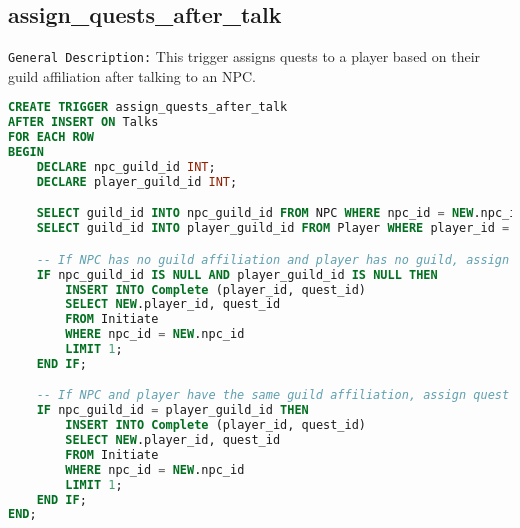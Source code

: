 \documentclass{article}
\begin{document}
\subsection{assign\_quests\_after\_talk}

\texttt{General Description:} This trigger assigns quests to a player based on their guild affiliation after talking to an NPC.

\begin{lstlisting}[language=SQL]
CREATE TRIGGER assign_quests_after_talk
AFTER INSERT ON Talks
FOR EACH ROW
BEGIN
    DECLARE npc_guild_id INT;
    DECLARE player_guild_id INT;

    SELECT guild_id INTO npc_guild_id FROM NPC WHERE npc_id = NEW.npc_id;
    SELECT guild_id INTO player_guild_id FROM Player WHERE player_id = NEW.player_id;

    -- If NPC has no guild affiliation and player has no guild, assign quest
    IF npc_guild_id IS NULL AND player_guild_id IS NULL THEN
        INSERT INTO Complete (player_id, quest_id)
        SELECT NEW.player_id, quest_id
        FROM Initiate
        WHERE npc_id = NEW.npc_id
        LIMIT 1;
    END IF;

    -- If NPC and player have the same guild affiliation, assign quest
    IF npc_guild_id = player_guild_id THEN
        INSERT INTO Complete (player_id, quest_id)
        SELECT NEW.player_id, quest_id
        FROM Initiate
        WHERE npc_id = NEW.npc_id
        LIMIT 1;
    END IF;
END;
\end{lstlisting}
\end{document}
